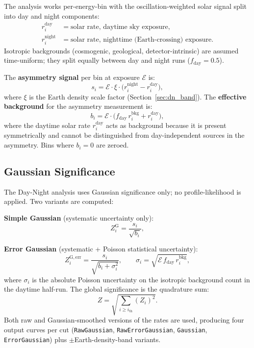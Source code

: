 \documentclass[12pt,a4paper]{article}
\begin{document}
The analysis works per-energy-bin with the oscillation-weighted solar
signal split into day and night components:
\begin{align}
  r_i^{\mathrm{day}} &= \text{solar rate, daytime sky exposure},\\
  r_i^{\mathrm{night}} &= \text{solar rate, nighttime (Earth-crossing) exposure}.
\end{align}
Isotropic backgrounds (cosmogenic, geological, detector-intrinsic) are assumed
time-uniform; they split equally between day and night runs
($f_{\mathrm{day}} = 0.5$).

The \textbf{asymmetry signal} per bin at exposure $\mathcal{E}$ is:
\begin{equation}
  s_i = \mathcal{E}\cdot\xi\cdot\bigl(r_i^{\mathrm{night}} - r_i^{\mathrm{day}}\bigr),
  \label{eq:dn_signal}
\end{equation}
where $\xi$ is the Earth density scale factor (Section~\ref{sec:dn_band}).
The \textbf{effective background} for the asymmetry measurement is:
\begin{equation}
  b_i = \mathcal{E}\cdot\bigl(f_{\mathrm{day}}\,r_i^{\mathrm{bkg}} + r_i^{\mathrm{day}}\bigr),
  \label{eq:dn_background}
\end{equation}
where the daytime solar rate $r_i^{\mathrm{day}}$ acts as background
because it is present symmetrically and cannot be distinguished from
day-independent sources in the asymmetry.  Bins where $b_i=0$ are zeroed.

\subsection{Gaussian Significance}
\label{sec:dn_gaussian}

The Day-Night analysis uses Gaussian significance only; no profile-likelihood
is applied.  Two variants are computed:

\medskip
\noindent\textbf{Simple Gaussian} (systematic uncertainty only):
\begin{equation}
  Z_i^{\mathrm{G}} = \frac{s_i}{\sqrt{b_i}},
  \label{eq:dn_simple_gaussian}
\end{equation}

\noindent\textbf{Error Gaussian} (systematic + Poisson statistical uncertainty):
\begin{equation}
  Z_i^{\mathrm{G,err}} = \frac{s_i}{\sqrt{b_i + \sigma_i^2}},
  \qquad
  \sigma_i = \sqrt{\mathcal{E}\,f_{\mathrm{day}}\,r_i^{\mathrm{bkg}}},
  \label{eq:dn_error_gaussian}
\end{equation}
where $\sigma_i$ is the absolute Poisson uncertainty on the isotropic
background count in the daytime half-run.  The global significance is the
quadrature sum:
\begin{equation}
  Z = \sqrt{\sum_{i \ge i_{\mathrm{th}}} \!\left(Z_i\right)^2}.
  \label{eq:dn_global}
\end{equation}
Both raw and Gaussian-smoothed versions of the rates are used,
producing four output curves per cut
(\texttt{RawGaussian}, \texttt{RawErrorGaussian}, \texttt{Gaussian},
\texttt{ErrorGaussian}) plus $\pm$Earth-density-band variants.
\end{document}
